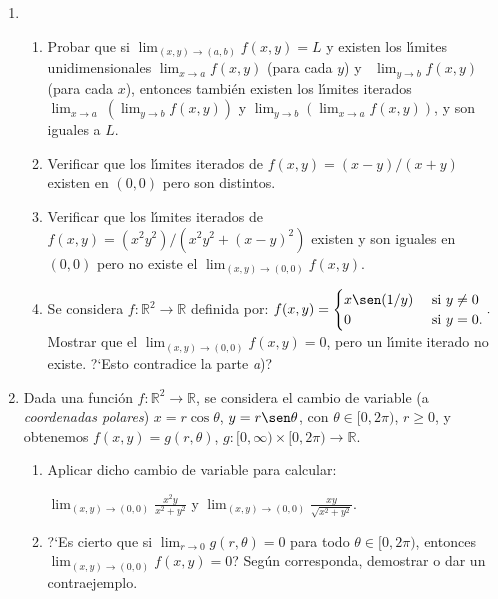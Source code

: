 \documentclass[11pt]{article}
\newcommand{\R}{\mathbb{R}}
\begin{document}
\begin{enumerate}
\item \begin{enumerate}

\item Probar que si $\lim_{(x,y)\rightarrow (a,b)}f(x,y)=L$ y
      existen los l\'\i mites unidimensionales   
      $\lim_{x\rightarrow a}f(x,y)$ (para cada $y$) y  \ $\lim_{y\rightarrow
      b}f(x,y)$ (para cada $x$), entonces tambi\'en existen  los l\'\i mites iterados  
      $\lim_{x\to a}\ \left( \lim_{y\to b}f(x,y)\right)$ y $ 
      \lim_{y\to b}\left( \lim_{x\to a}f(x,y) \right)$, y son iguales a 
      $L$. 
      \item Verificar que los l\'\i mites iterados de
      $f(x,y)=(x-y)/(x+y)$ existen en $(0,0)$ pero son distintos.
      \item Verificar que los l\'\i mites iterados de
      $f(x,y)=(x^{2}y^2)/(x^{2}y^{2}+(x-y)^2)$ existen y son iguales en
      $(0,0)$ pero no existe el $\lim_{(x,y)\rightarrow
      (0,0)}f(x,y)$.  
      \item Se considera $f:\R^2\to\R$ definida por:
      $ f(x,y)=\begin{cases} x\sen(1/y) &\textrm{ si } y\neq 0\\ 0 
      &\textrm{ si }y=0.\end{cases}.$\\
      Mostrar que el $\lim_{(x,y)\rightarrow (0,0)}f(x,y)=0$, pero un
      l\'\i mite iterado no existe. ?`Esto contradice la parte
      \textit{a})?  
      \end{enumerate}
              
\item Dada una funci\'on $f:\R^2\rightarrow\R$, se considera el cambio de
      variable (a {\em coordenadas polares}) $x=r\cos\theta$, $y=r\sen\theta$, con
      $\theta\in[0,2\pi)$, $r\geq 0$, y obtenemos $f(x,y)=g(r,\theta)$,
      $g:[0,\infty)\times[0,2\pi)\to\R$.  
      \begin{enumerate}
      \item Aplicar dicho cambio de variable para calcular:
      
      $ \lim_{(x,y)\rightarrow (0,0)}\frac{x^{2}y}{x^2 +y^2 }$ \quad y \quad 
        $\lim_{(x,y)\rightarrow (0,0)}\frac{xy}{\sqrt{x^2 +y^2}
        }$.
      \item ?`Es cierto que si $\lim_{r\to0}g(r,\theta)=0$ para todo $\theta\in [0,2\pi)$, entonces $\lim_{(x,y)\rightarrow (0,0)}f(x,y)=0$? Seg\'un corresponda, demostrar o dar un contraejemplo.
      \end{enumerate}


\end{enumerate}
\end{document}
